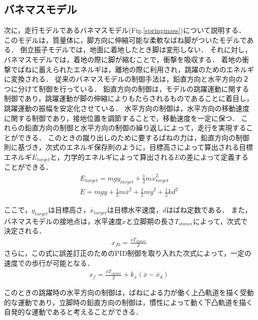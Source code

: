 \subsection{バネマスモデル}
次に，走行モデルであるバネマスモデル(Fig.\ref{springmass})について説明する．
このモデルは，質量体に，脚方向に伸縮可能な柔軟なばね脚がついたモデルである．
倒立振子モデルでは，地面に着地したとき脚は変形しない．
それに対し，バネマスモデルでは，着地の際に脚が縮むことで，衝撃を吸収する．
着地の衝撃でばねに蓄えられたエネルギは，離地の際に利用され，跳躍のためのエネルギに変換される．
従来のバネマスモデルの制御手法は，鉛直方向と水平方向の２つに分けて制御を行っている．
鉛直方向の制御は，モデルの跳躍運動に関する制御であり，跳躍運動が脚の伸縮によりもたらされるものであることに着目し，跳躍運動の振幅を安定化させている．
水平方向の制御は，水平方向の移動速度に関する制御であり，接地位置を調節することで，移動速度を一定に保つ．
これらの鉛直方向の制御と水平方向の制御の繰り返しによって，走行を実現することができる．
このときの蹴り出しのために要するばねの力は，鉛直方向の制御則に基づき，次式のエネルギ保存則のように，目標高さによって算出される目標エネルギ\(E_{target}\)と，力学的エネルギによって算出される\(E\)の差によって定義することができる．
\begin{gather}
 E_{target} = mgy_{target} + \frac{1}{2}m \dot{x}_{target}^2 \\
 E = mgy + \frac{1}{2}m \dot{x}^2 + \frac{1}{2}m \dot{y}^2 + \frac{1}{2}kd^2
\end{gather}

ここで，\(y_{target}\)は目標高さ，\(\dot{x}_{target}\)は目標水平速度，\(d\)はばね定数である．
また，バネマスモデルの接地点は，水平速度\(\dot{x}\)と立脚期の長さ\(T_{stance}\)によって，次式で決定される．
\begin{gather}
 x_{f0} = \frac{\dot{x} T_{stance}}{2}
\end{gather}
さらに，この式に誤差訂正のためのPID制御を取り入れた次式によって，一定の速度での歩行が可能となる．
\begin{gather}
 x_{f} = \frac{\dot{x} T_{stance}}{2} + k_{\dot{x}} (\dot{x} - \dot{x_d})
\end{gather}

このときの跳躍時の水平方向の制御は，ばねによる力が働く上凸軌道を描く受動的な運動であり，立脚時の鉛直方向の制御は，慣性によって動く下凸軌道を描く自発的な運動であると考えることができる．

